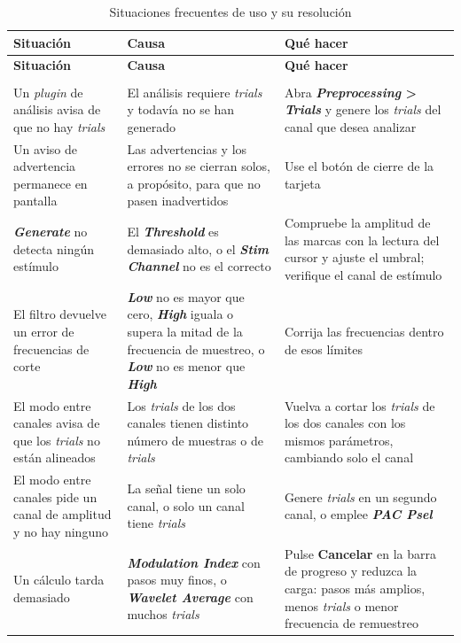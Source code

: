 \documentclass[11pt,a4paper]{article}
\begin{document}
\begin{center}
\small
\begin{longtable}{|p{}|p{}|p{}|}
\hline
\textbf{Situaci\'on} & \textbf{Causa} & \textbf{Qu\'e hacer} \\
\hline
\endfirsthead
\hline
\textbf{Situaci\'on} & \textbf{Causa} & \textbf{Qu\'e hacer} \\
\hline
\endhead
\hline
\endfoot
\hline
\caption{Situaciones frecuentes de uso y su resoluci\'on} \label{tab:mu_problemas_uso} \\
\endlastfoot
Un \textit{plugin} de an\'alisis avisa de que no hay \textit{trials} & El an\'alisis requiere \textit{trials} y todav\'ia no se han generado & Abra \textbf{\textit{Preprocessing} > \textit{Trials}} y genere los \textit{trials} del canal que desea analizar \\
\hline
Un aviso de advertencia permanece en pantalla & Las advertencias y los errores no se cierran solos, a prop\'osito, para que no pasen inadvertidos & Use el bot\'on de cierre de la tarjeta \\
\hline
\textbf{\textit{Generate}} no detecta ning\'un est\'imulo & El \textbf{\textit{Threshold}} es demasiado alto, o el \textbf{\textit{Stim Channel}} no es el correcto & Compruebe la amplitud de las marcas con la lectura del cursor y ajuste el umbral; verifique el canal de est\'imulo \\
\hline
El filtro devuelve un error de frecuencias de corte & \textbf{\textit{Low}} no es mayor que cero, \textbf{\textit{High}} iguala o supera la mitad de la frecuencia de muestreo, o \textbf{\textit{Low}} no es menor que \textbf{\textit{High}} & Corrija las frecuencias dentro de esos l\'imites \\
\hline
El modo entre canales avisa de que los \textit{trials} no est\'an alineados & Los \textit{trials} de los dos canales tienen distinto n\'umero de muestras o de \textit{trials} & Vuelva a cortar los \textit{trials} de los dos canales con los mismos par\'ametros, cambiando solo el canal \\
\hline
El modo entre canales pide un canal de amplitud y no hay ninguno & La se\~nal tiene un solo canal, o solo un canal tiene \textit{trials} & Genere \textit{trials} en un segundo canal, o emplee \textbf{\textit{PAC Psel}} \\
\hline
Un c\'alculo tarda demasiado & \textbf{\textit{Modulation Index}} con pasos muy finos, o \textbf{\textit{Wavelet Average}} con muchos \textit{trials} & Pulse \textbf{Cancelar} en la barra de progreso y reduzca la carga: pasos m\'as amplios, menos \textit{trials} o menor frecuencia de remuestreo \\

\end{longtable}
\end{center}
\end{document}
